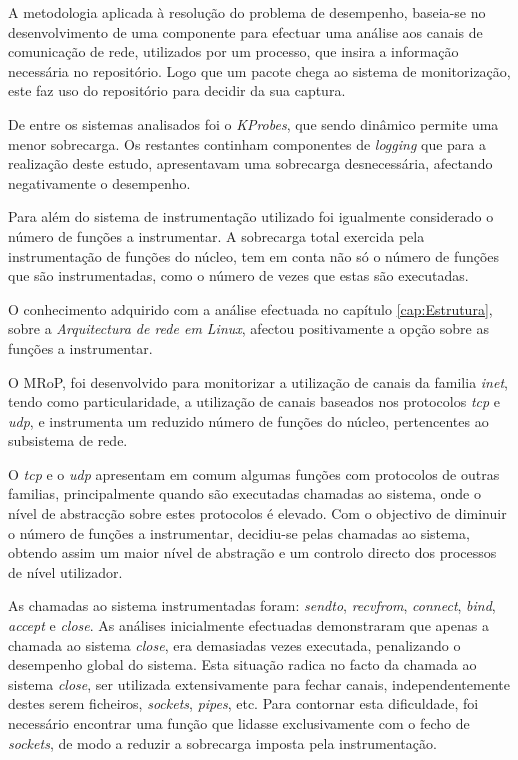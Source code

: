 
A metodologia aplicada à resolução do problema de desempenho, baseia-se no desenvolvimento de uma componente para efectuar uma análise aos canais de comunicação de rede, utilizados por um processo, que insira a informação necessária no repositório.
Logo que um pacote chega ao sistema de monitorização, este faz uso do repositório para decidir da sua captura.


De entre os sistemas analisados foi o \textit{KProbes}, que sendo dinâmico permite uma menor sobrecarga.
Os restantes continham componentes de \textit{logging} que para a realização deste estudo, apresentavam uma sobrecarga desnecessária, afectando negativamente o desempenho.

Para além do sistema de instrumentação utilizado foi igualmente considerado o número de funções a instrumentar.
A sobrecarga total exercida pela instrumentação de funções do núcleo, tem em conta não só o número de funções que são instrumentadas, como o número de vezes que estas são executadas.

O conhecimento adquirido com a análise efectuada no capítulo \ref{cap:Estrutura}, sobre a \textit{Arquitectura de rede em Linux}, afectou positivamente a opção sobre as funções a instrumentar.

O MRoP, foi desenvolvido para monitorizar a utilização de canais da familia \textit{inet}, tendo como particularidade, a utilização de canais baseados nos protocolos \textit{tcp} e \textit{udp}, e instrumenta um reduzido número de funções do núcleo, pertencentes ao subsistema de rede.

O \textit{tcp} e o \textit{udp} apresentam em comum algumas funções com protocolos de outras familias, principalmente quando são executadas chamadas ao sistema, onde o nível de abstracção sobre estes protocolos é elevado.
Com o objectivo de diminuir o número de funções a instrumentar, decidiu-se pelas chamadas ao sistema, obtendo assim um maior nível de abstração e um controlo directo dos processos de nível utilizador.

As chamadas ao sistema instrumentadas foram: \textit{sendto}, \textit{recvfrom}, \textit{connect}, \textit{bind}, \textit{accept} e \textit{close}.
As análises inicialmente efectuadas demonstraram que apenas a chamada ao sistema \textit{close}, era demasiadas vezes executada, penalizando o desempenho global do sistema.
Esta situação radica no facto da chamada ao sistema \textit{close}, ser utilizada extensivamente para fechar canais, independentemente destes serem ficheiros, \textit{sockets}, \textit{pipes}, etc.
Para contornar esta dificuldade, foi necessário encontrar uma função que lidasse exclusivamente com o fecho de \textit{sockets}, de modo a reduzir a sobrecarga imposta pela instrumentação.


